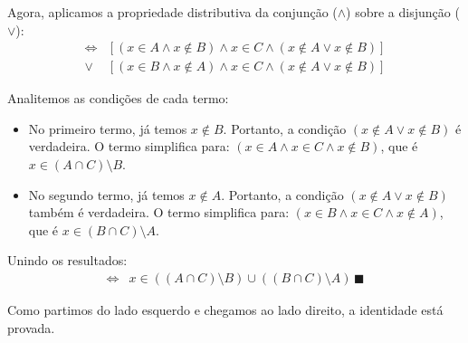 \documentclass[11pt,reqno,a4paper]{amsart}
\begin{document}
Agora, aplicamos a propriedade distributiva da conjunção ($\land$) sobre a disjunção ($\lor$):
\begin{align*}
\iff & [ (x \in A \land x \notin B) \land x \in C \land (x \notin A \lor x \notin B) ] \\
\lor & [ (x \in B \land x \notin A) \land x \in C \land (x \notin A \lor x \notin B) ]
\end{align*}

Analitemos as condições de cada termo:
\begin{itemize}
    \item No primeiro termo, já temos $x \notin B$. Portanto, a condição $(x \notin A \lor x \notin B)$ é verdadeira. O termo simplifica para: $(x \in A \land x \in C \land x \notin B)$, que é $x \in (A \cap C) \setminus B$.
    \item No segundo termo, já temos $x \notin A$. Portanto, a condição $(x \notin A \lor x \notin B)$ também é verdadeira. O termo simplifica para: $(x \in B \land x \in C \land x \notin A)$, que é $x \in (B \cap C) \setminus A$.
\end{itemize}

Unindo os resultados:
\begin{align*}
\iff & x \in ((A \cap C) \setminus B) \cup ((B \cap C) \setminus A)\, \blacksquare
\end{align*}

Como partimos do lado esquerdo e chegamos ao lado direito, a identidade está provada.
\end{document}
